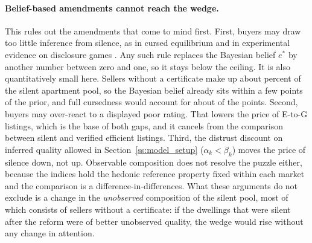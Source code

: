 \paragraph{Belief-based amendments cannot reach the wedge.}
This rules out the amendments that come to mind first. First, buyers may draw too little inference from silence, as in cursed equilibrium and in experimental evidence on disclosure games \citep[e.g.,][]{eyster_cursed_2005, jin_is_2021, hagenbach_motivated_2025}. Any such rule replaces the Bayesian belief $e^*$ by another number between zero and one, so it stays below the ceiling. It is also quantitatively small here. Sellers without a certificate make up about \attShareUninfApt{} percent of the silent apartment pool, so the Bayesian belief already sits within a few points of the prior, and full cursedness would account for about \attCursedApt{} of the \attLamApt{} points. Second, buyers may over-react to a displayed poor rating. That lowers the price of E-to-G listings, which is the base of both gaps, and it cancels from the comparison between silent and verified efficient listings. Third, the distrust discount on inferred quality allowed in Section~\ref{ss:model_setup} ($\alpha_k<\beta_k$) moves the price of silence down, not up. Observable composition does not resolve the puzzle either, because the indices hold the hedonic reference property fixed within each market and the comparison is a difference-in-differences. What these arguments do not exclude is a change in the \emph{unobserved} composition of the silent pool, most of which consists of sellers without a certificate: if the dwellings that were silent after the reform were of better unobserved quality, the wedge would rise without any change in attention.
